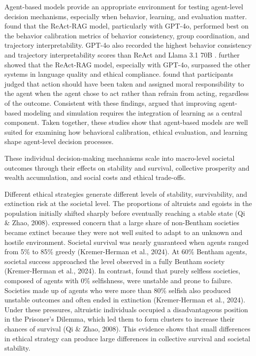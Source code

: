 \documentclass{icsthesis}
\begin{document}
\begin{mainmatter}
Agent-based models provide an appropriate environment for testing agent-level decision mechanisms, especially when behavior, learning, and evaluation matter. \citet{Kang2025} found that the ReAct-RAG model, particularly with GPT-4o, performed best on the behavior calibration metrics of behavior consistency, group coordination, and trajectory interpretability. GPT-4o also recorded the highest behavior consistency and trajectory interpretability scores than ReAct and Llama 3.1 70B \citep{Kang2025}. \citet{Kang2025} further showed that the ReAct-RAG model, especially with GPT-4o, surpassed the other systems in language quality and ethical compliance. \citet{TimmonsByrne2018} found that participants judged that action should have been taken and assigned moral responsibility to the agent when the agent chose to act rather than refrain from acting, regardless of the outcome. Consistent with these findings, \citet{Tolk2022} argued that improving agent-based modeling and simulation requires the integration of learning as a central component. Taken together, these studies show that agent-based models are well suited for examining how behavioral calibration, ethical evaluation, and learning shape agent-level decision processes.

These individual decision-making mechanisms scale into macro-level societal outcomes through their effects on stability and survival, collective prosperity and wealth accumulation, and social costs and ethical trade-offs.

Different ethical strategies generate different levels of stability, survivability, and extinction risk at the societal level. The proportions of altruists and egoists in the population initially shifted sharply before eventually reaching a stable state (Qi \& Zhao, 2008). \citet{KremerHerman2024b} expressed concern that a large share of non-Bentham societies became extinct because they were not well suited to adapt to an unknown and hostile environment. Societal survival was nearly guaranteed when agents ranged from 5\% to 85\% greedy (Kremer-Herman et al., 2024). At 60\% Bentham agents, societal success approached the level observed in a fully Bentham society (Kremer-Herman et al., 2024). In contrast, \citet{KremerHerman2024b} found that purely selfless societies, composed of agents with 0\% selfishness, were unstable and prone to failure. Societies made up of agents who were more than 80\% selfish also produced unstable outcomes and often ended in extinction (Kremer-Herman et al., 2024). Under these pressures, altruistic individuals occupied a disadvantageous position in the Prisoner’s Dilemma, which led them to form clusters to increase their chances of survival (Qi \& Zhao, 2008). This evidence shows that small differences in ethical strategy can produce large differences in collective survival and societal stability.


\end{mainmatter}
\end{document}
